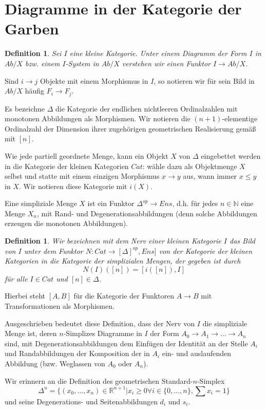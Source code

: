 \documentclass[a4paper]{article}
\newtheorem{defn}[satz]{Definition}
\newcommand{\N}{\mathbb{N}}
\newcommand{\R}{\mathbb{R}}
\newcommand{\op}{^{op}}
\begin{document}
\section{Diagramme in der Kategorie der Garben}

\begin{defn}
  Sei $I$ eine kleine Kategorie. Unter einem Diagramm der Form $I$ in
  $Ab/X$ bzw. einem $I$-System in $Ab/X$ verstehen wir einen Funktor $I
  \to Ab/X$.
\end{defn}

Sind $i \to j$ Objekte mit einem Morphismus in $I$, so notieren wir
für sein Bild in $Ab/X$ häufig $F_i \to F_j$.

Es bezeichne $\Delta$ die Kategorie der endlichen nichtleeren
Ordinalzahlen mit monotonen Abbildungen als Morphismen. Wir notieren
die $(n+1)$-elementige Ordinalzahl der Dimension ihrer zugehörigen
geometrischen Realisierung gemäß mit $[n]$.

Wie jede partiell geordnete Menge, kann ein Objekt $X$ von $\Delta$
eingebettet werden in die Kategorie der kleinen Kategorien $Cat$:
wähle dazu als Objektmenge $X$ selbst und statte mit einem einzigen
Morphismus $x \to y$ aus, wann immer $x \leq y$ in $X$. Wir notieren
diese Kategorie mit $i(X)$.

Eine simpliziale Menge $X$ ist ein Funktor $\Delta\op \to Ens$,
d.h. für jedes $n \in \N$ eine Menge $X_n$, mit Rand- und
Degenerationsabbildungen (denn solche Abbildungen erzeugen die
monotonen Abbildungen).

\begin{defn}
  Wir bezeichnen mit dem Nerv einer kleinen Kategorie $I$ das Bild von
  $I$ unter dem Funktor $N: Cat \to [\Delta]\op, Ens]$ von der
    Kategorie der kleinen Kategorien in die Kategorie der simplizialen
    Mengen, der gegeben ist durch $$N(I)([n]) = [i([n]), I]$$ für alle
    $I \in Cat$ und $[n] \in \Delta$.
\end{defn}

Hierbei steht $[A, B]$ für die Kategorie der Funktoren $A \to B$ mit
Transformationen als Morphismen.

Ausgeschrieben bedeutet diese Definition, dass der Nerv von $I$ die
simpliziale Menge ist, deren $n$-Simplizes Diagramme in $I$ der Form
$A_0 \to A_1 \to \dots \to A_n$ sind, mit Degenerationsabbildungen dem
Einfügen der Identität an der Stelle $A_i$ und Randabbildungen der
Komposition der in $A_i$ ein- und auslaufenden Abbildung
(bzw. Weglassen von $A_0$ oder $A_n$).

Wir erinnern an die Definition des geometrischen Standard-$n$-Simplex
$$ \Delta^n = \{(x_0, \dots, x_n) \in \R^{n+1} | x_i \geq 0 \forall
i \in \{0, \dots, n\}, \sum x_i = 1\} $$ und seine Degenerations- und
Seitenabbildungen $d_i$ und $s_i$. 
\end{document}
